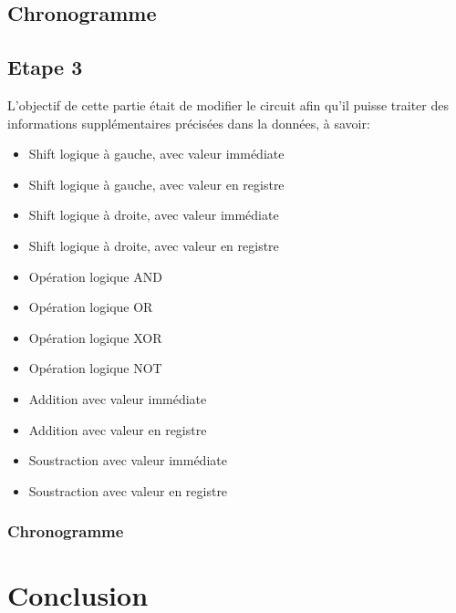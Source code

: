 \documentclass[a4paper]{article} %
\begin{document}
\subsection{Chronogramme}

\subsection{Etape 3}
L'objectif de cette partie était de modifier le circuit afin qu'il puisse traiter des informations supplémentaires précisées dans la données, à savoir:
\medskip
\begin{itemize}
    \item Shift logique à gauche, avec valeur immédiate
    \item Shift logique à gauche, avec valeur en registre
    \item Shift logique à droite, avec valeur immédiate
    \item Shift logique à droite, avec valeur en registre
    \item Opération logique AND
    \item Opération logique OR
    \item Opération logique XOR
    \item Opération logique NOT
    \item Addition avec valeur immédiate
    \item Addition avec valeur en registre
    \item Soustraction avec valeur immédiate
    \item Soustraction avec valeur en registre
\end{itemize}
\subsubsection{Chronogramme}
\section{Conclusion}
\end{document}
